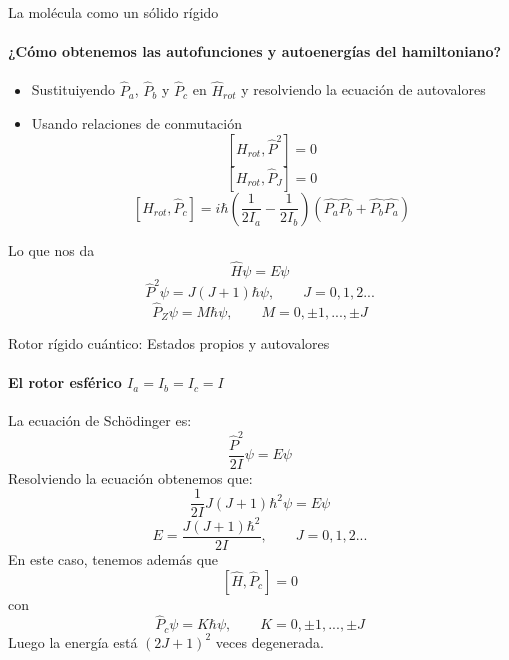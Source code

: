 \documentclass[a4paper]{beamer}
\begin{document}
\begin{frame}{La molécula como un sólido rígido}
\framesubtitle{¿Cómo obtenemos las autofunciones y autoenergías del hamiltoniano?}
\begin{itemize}
\item	Sustituiyendo $\hat P_a$, $\hat P_b$ y $\hat P_c$ en $\hat H_{rot}$ y resolviendo la ecuación de autovalores 
\item Usando relaciones de conmutación 
\begin{equation*}
\left[H_{rot}, \hat P^2 \right] = 0
\end{equation*}
\begin{equation*}
\left[H_{rot}, \hat P_J \right] = 0
\end{equation*}
\begin{equation*}
\left[H_{rot}, \hat P_c \right] = i\hbar \left(\frac{1}{2I_a}-\frac{1}{2I_b}\right)\left(\hat{P_a}\hat{P_b}+\hat{P_b}\hat{P_a}\right)
\end{equation*}
\end{itemize}
Lo que nos da 
\begin{equation}
\hat H\psi = E\psi
\end{equation}
\begin{equation}
\hat P^2\psi = J(J+1)\hbar \psi, \qquad J=0,1,2...
\end{equation}
\begin{equation}
\hat P_Z\psi = M\hbar\psi, \qquad M = 0,\pm 1,...,\pm J
\end{equation}
\end{frame}

\begin{frame}{Rotor rígido cuántico: Estados propios y autovalores}
\framesubtitle{El rotor esférico $I_a=I_b=I_c= I$}
La ecuación de Schödinger es:
\begin{equation*}
\frac{\hat P^2}{2I} \psi = E\psi
\end{equation*}
Resolviendo la ecuación obtenemos que:$$\frac{1}{2I}J(J+1)\hbar^2\psi=E\psi$$
\begin{equation}
E=\frac{J(J+1)\hbar^2}{2I}, \qquad J=0,1,2...
\end{equation}
En este caso, tenemos además que
\begin{equation}
\left[\hat H,\hat P_c \right]=0
\end{equation}
con $$\hat P_c \psi = K\hbar\psi, \qquad K = 0, \pm 1,..., \pm J$$
Luego la energía está $(2J+1)^2$ veces degenerada.
\end{frame}
\end{document}

